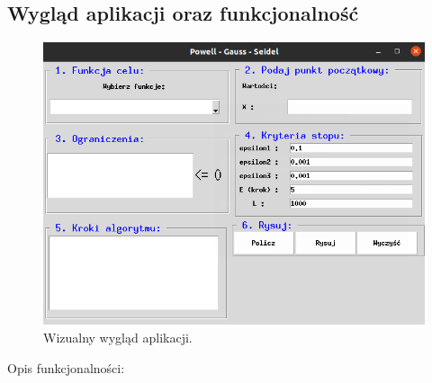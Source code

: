 \documentclass[a4paper,12pt]{article}
\begin{document}
\subsection{Wygląd aplikacji oraz funkcjonalność}
\begin{figure}[H]
    \centering
    \includegraphics[width=\textwidth]{images/timo_aplikacja.png}
    \caption{Wizualny wygląd aplikacji.}
    \label{uml_gauss_seidel}
\end{figure}

\begin{flushleft}
    Opis funkcjonalności:
\end{flushleft}
\end{document}
